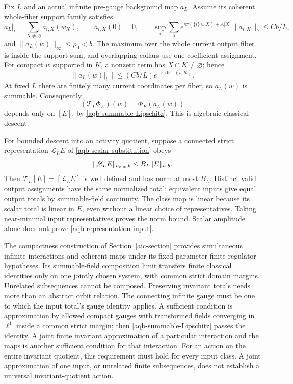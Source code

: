 Fix $L$ and an actual infinite pre-gauge background map $a_L$.
Assume its coherent whole-fiber support family satisfies
\begin{equation}
 a_L|_i=\sum_{X\ne\varnothing}a_{i,X}(w_X),\qquad
 a_{i,X}(0)=0,\qquad
 \sup_i\sum_X e^{\kappa\tau(\{i\}\cup X)+A|X|}
                \|a_{i,X}\|_b\le Cb/L,
 \label{aqb-background-family}
\end{equation}
and $\|a_L(w)\|_\infty\le\rho_0<b$. The maximum over the
whole current output fiber is inside the support sum, and
overlapping collars use one coefficient assignment. For compact
$w$ supported in $K$, a nonzero term has $X\cap K\ne\varnothing$;
hence
\begin{equation}
 \|a_L(w)|_i\|\le(Cb/L)e^{-\kappa\operatorname{dist}(i,K)}.
 \label{aqb-background-summability}
\end{equation}
At fixed $L$ there are finitely many current coordinates per
fiber, so $a_L(w)$ is summable. Consequently
\begin{equation}
 (\mathcal T_L\Phi_E)(w)=\Phi_E(a_L(w))
 \label{aqb-scalar-substitution}
\end{equation}
depends only on $[E]$, by \eqref{aqb-summable-Lipschitz}.
This is algebraic classical descent.

For bounded descent into an activity quotient, suppose a
connected strict representation $\mathscr L_LE$ of
\eqref{aqb-scalar-substitution} obeys
\begin{equation}
 \|\mathscr L_LE\|_{a_{\rm out},b}
                         \le B_L\|E\|_{a,b}.
 \label{aqb-representation-input}
\end{equation}
Then $\mathcal T_L[E]=[\mathscr L_LE]$ is well defined and has
norm at most $B_L$. Distinct valid output assignments have the
same normalized total; equivalent inputs give equal output
totals by summable-field continuity. The class map is linear
because its scalar total is linear in $E$, even without a linear
choice of representatives. Taking near-minimal input
representatives proves the norm bound. Scalar amplitude alone
does not prove \eqref{aqb-representation-input}.

The compactness construction of Section~\ref{aic-section}
provides simultaneous infinite interactions and coherent maps
under its fixed-parameter finite-regulator hypotheses. Its
summable-field composition limit transfers finite classical
identities only on one jointly chosen system, with common strict
domain margins. Unrelated subsequences cannot be composed.
Preserving invariant totals needs more than an abstract orbit
relation. The connecting infinite gauge must be one to which
the input total's gauge identity applies. A sufficient condition
is approximation by allowed compact gauges with transformed
fields converging in $\ell^1$ inside a common strict margin;
then \eqref{aqb-summable-Lipschitz} passes the identity. A joint
finite invariant approximation of a particular interaction and
the maps is another sufficient condition for that interaction.
For an action on the entire invariant quotient, this requirement
must hold for every input class. A joint approximation of one
input, or unrelated finite subsequences, does not establish a
universal invariant-quotient action.

